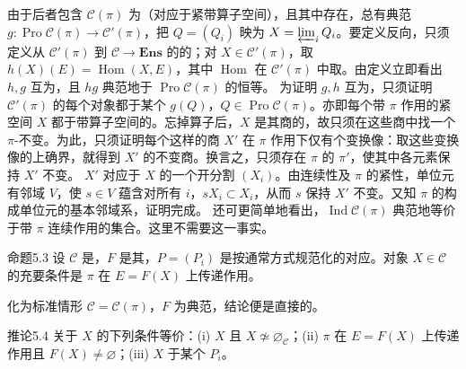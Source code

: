 由于后者包含 $\mathcal C(\pi)$ 为（对应于紧带算子空间），且其中存在，总有典范 $g:\operatorname{Pro}\mathcal C(\pi)\to\mathcal C'(\pi)$，把 $Q=(Q_i)$ 映为 $X=\varprojlim_iQ_i$。要定义反向，只须定义从 $\mathcal C'(\pi)$ 到 $\mathcal C\to\mathbf{Ens}$ 的的；对 $X\in\mathcal C'(\pi)$，取 $h(X)(E)=\operatorname{Hom}(X,E)$，其中 $\operatorname{Hom}$ 在 $\mathcal C'(\pi)$ 中取。由定义立即看出 $h,g$ 互为，且 $hg$ 典范地于 $\operatorname{Pro}\mathcal C(\pi)$ 的恒等。
为证明 $g,h$ 互为，只须证明 $\mathcal C'(\pi)$ 的每个对象都于某个 $g(Q)$，$Q\in\operatorname{Pro}\mathcal C(\pi)$。亦即每个带 $\pi$ 作用的紧空间 $X$ 都于带算子空间的。忘掉算子后，$X$ 是其商的，故只须在这些商中找一个 $\pi$-不变。为此，只须证明每个这样的商 $X'$ 在 $\pi$ 作用下仅有个变换像：取这些变换像的上确界，就得到 $X'$ 的不变商。换言之，只须存在 $\pi$ 的 $\pi'$，使其中各元素保持 $X'$ 不变。
$X'$ 对应于 $X$ 的一个开分割 $(X_i)$。由连续性及 $\pi$ 的紧性，单位元有邻域 $V$，使 $s\in V$ 蕴含对所有 $i$，$sX_i\subset X_i$，从而 $s$ 保持 $X'$ 不变。又知 $\pi$ 的构成单位元的基本邻域系，证明完成。
还可更简单地看出，$\operatorname{Ind}\mathcal C(\pi)$ 典范地等价于带 $\pi$ 连续作用的集合。这里不需要这一事实。
\begin{SGAresult}{命题}{5.3}
设 $\mathcal C$ 是，$F$ 是其，$P=(P_i)$ 是按通常方式规范化的对应。对象 $X\in\mathcal C$ 的充要条件是 $\pi$ 在 $E=F(X)$ 上传递作用。
\end{SGAresult}
化为标准情形 $\mathcal C=\mathcal C(\pi)$，$F$ 为典范，结论便是直接的。
\begin{SGAresult}{推论}{5.4}
关于 $X$ 的下列条件等价：(i) $X$ 且 $X\not\simeq\varnothing_{\mathcal C}$；(ii) $\pi$ 在 $E=F(X)$ 上传递作用且 $F(X)\neq\varnothing$；(iii) $X$ 于某个 $P_i$。
\end{SGAresult}
